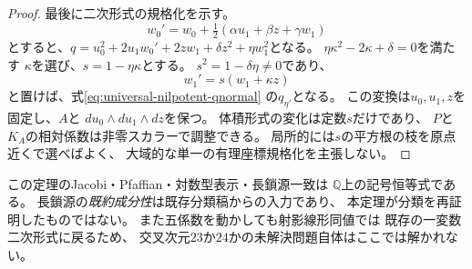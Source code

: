 \begin{proof}
最後に二次形式の規格化を示す。
\[
 w_0'=w_0+\tfrac12(\alpha u_1+\beta z+\gamma w_1)
\]
とすると、$q=u_0^2+2u_1w_0'+2zw_1+
\delta z^2+\eta w_1^2$となる。
$\eta\kappa^2-2\kappa+\delta=0$を満たす
$\kappa$を選び、$s=1-\eta\kappa$とする。
$s^2=1-\delta\eta\ne0$であり、
\[
 w_1'=s(w_1+\kappa z)
\]
と置けば、式\eqref{eq:universal-nilpotent-qnormal}
の$q_{\eta'}$となる。
この変換は$u_0,u_1,z$を固定し、$A$と
$du_0\wedge du_1\wedge dz$を保つ。
体積形式の変化は定数$s$だけであり、
$P$と$K_A$の相対係数は非零スカラーで調整できる。
局所的には$s$の平方根の枝を原点近くで選べばよく、
大域的な単一の有理座標規格化を主張しない。
\end{proof}

\begin{remark}[研究上の射程]
この定理のJacobi・Pfaffian・対数型表示・長鎖源一致は
$\mathbb Q$上の記号恒等式である。
長鎖源の\emph{既約成分性}は既存分類稿からの入力であり、
本定理が分類を再証明したものではない。
また五係数を動かしても射影線形同値では
既存の一変数二次形式に戻るため、
交叉次元$23$か$24$かの未解決問題自体はここでは解かれない。
\end{remark}


